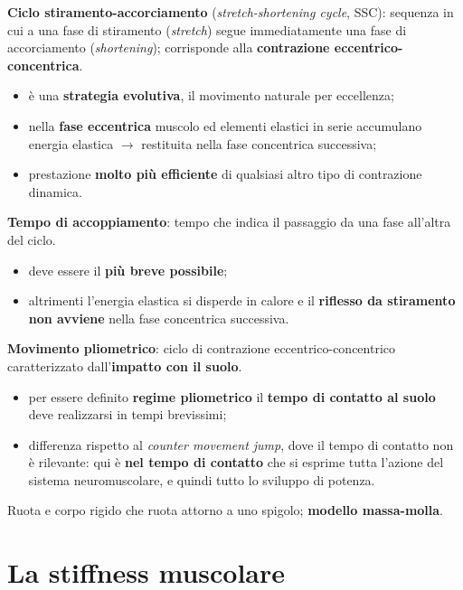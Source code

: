 \textbf{Ciclo stiramento-accorciamento} (\textit{stretch-shortening cycle}, SSC): sequenza in cui
a una fase di stiramento (\textit{stretch}) segue immediatamente una fase di accorciamento
(\textit{shortening}); corrisponde alla \textbf{contrazione eccentrico-concentrica}.

\begin{itemize}
  \item è una \textbf{strategia evolutiva}, il movimento naturale per eccellenza;
  \item nella \textbf{fase eccentrica} muscolo ed elementi elastici in serie accumulano energia
    elastica $\rightarrow$ restituita nella fase concentrica successiva;
  \item prestazione \textbf{molto più efficiente} di qualsiasi altro tipo di contrazione dinamica.
\end{itemize}

\textbf{Tempo di accoppiamento}: tempo che indica il passaggio da una fase all'altra del ciclo.
\begin{itemize}
  \item deve essere il \textbf{più breve possibile};
  \item altrimenti l'energia elastica si disperde in calore e il \textbf{riflesso da stiramento
    non avviene} nella fase concentrica successiva.
\end{itemize}

\textbf{Movimento pliometrico}: ciclo di contrazione eccentrico-concentrico caratterizzato
dall'\textbf{impatto con il suolo}.
\begin{itemize}
  \item per essere definito \textbf{regime pliometrico} il \textbf{tempo di contatto al suolo}
    deve realizzarsi in tempi brevissimi;
  \item differenza rispetto al \textit{counter movement jump}, dove il tempo di contatto non è
    rilevante: qui è \textbf{nel tempo di contatto} che si esprime tutta l'azione del sistema
    neuromuscolare, e quindi tutto lo sviluppo di potenza.
\end{itemize}

Ruota e corpo rigido che ruota attorno a uno spigolo; \textbf{modello massa-molla}.

\section{La stiffness muscolare}

